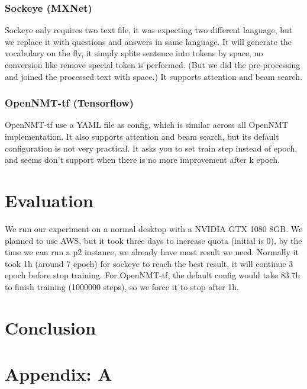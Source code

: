 \documentclass{article}
\begin{document}
\subsubsection{Sockeye (MXNet)}
\label{subsubsec:sockeye}

Sockeye only requires two text file, it was expecting two different language, but we replace it with questions and answers in same language.
It will generate the vocabulary on the fly, it simply splits sentence into tokens by space, no conversion like remove special token is performed.
(But we did the pre-processing and joined the processed text with space.) It supports attention and beam search.

\subsubsection{OpenNMT-tf (Tensorflow)}
\label{subsubsec:opennmt-tf}

OpenNMT-tf use a YAML file as config, which is similar across all OpenNMT implementation.
It also supports attention and beam search, but its default configuration is not very practical.
It asks you to set train step instead of epoch, and seems don't support when there is no more improvement after k epoch.

\section{Evaluation}
\label{sec:evaluation}

We run our experiment on a normal desktop with a NVIDIA GTX 1080 8GB.
We planned to use AWS, but it took three days to increase quota (initial is 0),
by the time we can run a p2 instance, we already have most result we need.
Normally it took 1h (around 7 epoch) for sockeye to reach the best result, it will continue 3 epoch before stop training.
For OpenNMT-tf, the default config would take 83.7h to finish training (1000000 steps), so we force it to stop after 1h.

\section{Conclusion}
\label{sec:conclusion}

\printbibliography

\section*{Appendix: A}
\label{sec:appendix:a}
\end{document}
